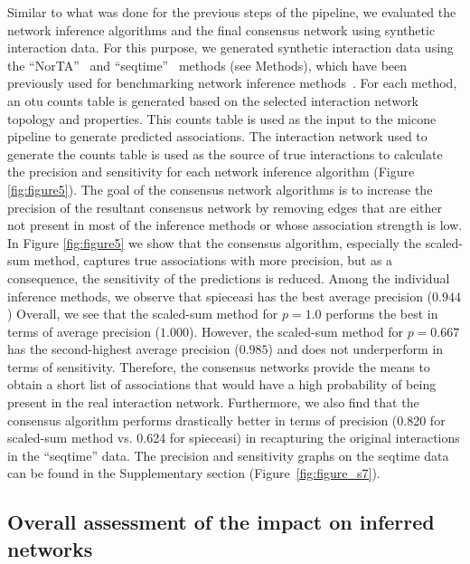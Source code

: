   Similar to what was done for the previous steps of the pipeline, we evaluated the network inference algorithms and the final consensus network using synthetic interaction data.
  For this purpose, we generated synthetic interaction data using the ``NorTA''~\cite{Kurtz2015} and ``seqtime''~\cite{faustSignaturesEcologicalProcesses2018} methods (see Methods), which have been previously used for benchmarking network inference methods~\cite{Kurtz2015,Weiss2016}.
  For each method, an \ac{otu} counts table is generated based on the selected interaction network topology and properties.
  This counts table is used as the input to the \ac{micone} pipeline to generate predicted associations.
  The interaction network used to generate the counts table is used as the source of true interactions to calculate the precision and sensitivity for each network inference algorithm (Figure \ref{fig:figure5}).
  The goal of the consensus network algorithms is to increase the precision of the resultant consensus network by removing edges that are either not present in most of the inference methods or whose association strength is low.
  In Figure \ref{fig:figure5} we show that the consensus algorithm, especially the scaled-sum method, captures true associations with more precision, but as a consequence, the sensitivity of the predictions is reduced.
  Among the individual inference methods, we observe that \acs{spieceasi} has the best average precision ($0.944$)
  Overall, we see that the scaled-sum method for $p=1.0$ performs the best in terms of average precision ($1.000$).
  However, the scaled-sum method for $p=0.667$ has the second-highest average precision ($0.985$) and does not underperform in terms of sensitivity.
  Therefore, the consensus networks provide the means to obtain a short list of associations that would have a high probability of being present in the real interaction network.
  Furthermore, we also find that the consensus algorithm performs drastically better in terms of precision (0.820 for scaled-sum method vs. 0.624 for \acs{spieceasi}) in recapturing the original interactions in the ``seqtime'' data.
  The precision and sensitivity graphs on the seqtime data can be found in the Supplementary section (Figure~\ref{fig:figure_s7}).

  \FloatBarrier

  \subsection*{Overall assessment of the impact on inferred networks}

